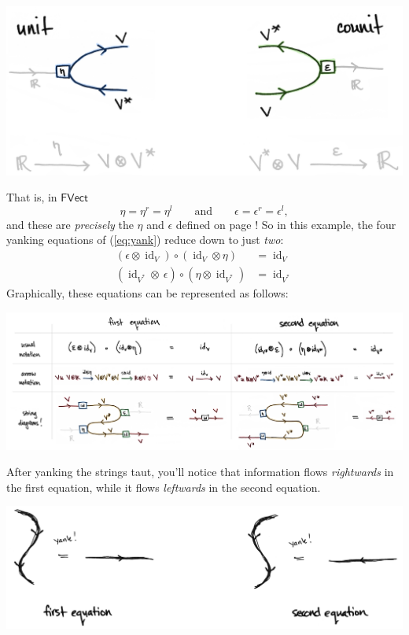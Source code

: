 \documentclass{tufte-handout-tai}
\newcounter{dummy} %
\DeclareMathOperator{\id}{id}
\theoremstyle{plain}
\theoremstyle{definition}
\theoremstyle{remark}
\begin{document}
\begin{center}
\includegraphics[width=!,totalheight=!,scale=0.35]{unitcounit.jpg}
\end{center}
That is, in $\mathsf{FVect}$ \[\eta=\eta^r=\eta^l \qquad\text{and}\qquad\epsilon=\epsilon^r=\epsilon^l,\]
and these are \textit{precisely} the $\eta$ and $\epsilon$ defined on page \pageref{lis:ucounit}! So in this example, the four yanking equations of (\ref{eq:yank}) reduce down to just \textit{two}:
\begin{equation}\label{eq:yankvect}
\begin{aligned}
(\epsilon \otimes \id_V)\circ (\id_V\otimes \eta)&=\id_V\\[7pt]
(\id_{V^*}\otimes\:\epsilon)\circ (\eta\otimes \id_{V^*})&=\id_{V^*}
\end{aligned}
\end{equation}
Graphically, these equations can be represented as follows:
\begin{fullwidth}
\begin{center}
\label{fig:yank}
\includegraphics{yank.jpg}
\end{center}
\end{fullwidth}
\noindent After yanking the strings taut, you'll notice that information flows \textit{rightwards} in the first equation, while it flows \textit{leftwards} in the second equation.
\begin{center}
\includegraphics[width=!,totalheight=!,scale=0.4]{yank3.jpg}
\end{center}
\end{document}
